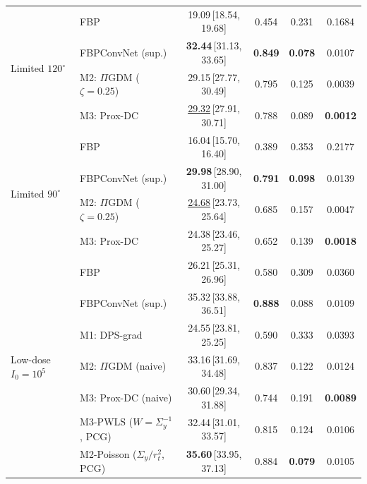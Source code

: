 \begin{tabular}{llcccc}
\midrule
\multirow{4}{*}{Limited $120^\circ$}
 & FBP & 19.09\,{\scriptsize[18.54, 19.68]} & 0.454 & 0.231 & 0.1684 \\
 & FBPConvNet (sup.) & \textbf{32.44}\,{\scriptsize[31.13, 33.65]} & \textbf{0.849} & \textbf{0.078} & 0.0107 \\
 & M2: $\Pi$GDM ($\zeta{=}0.25$) & 29.15\,{\scriptsize[27.77, 30.49]} & 0.795 & 0.125 & 0.0039 \\
 & M3: Prox-DC & \underline{29.32}\,{\scriptsize[27.91, 30.71]} & 0.788 & 0.089 & \textbf{0.0012} \\
\midrule
\multirow{4}{*}{Limited $90^\circ$}
 & FBP & 16.04\,{\scriptsize[15.70, 16.40]} & 0.389 & 0.353 & 0.2177 \\
 & FBPConvNet (sup.) & \textbf{29.98}\,{\scriptsize[28.90, 31.00]} & \textbf{0.791} & \textbf{0.098} & 0.0139 \\
 & M2: $\Pi$GDM ($\zeta{=}0.25$) & \underline{24.68}\,{\scriptsize[23.73, 25.64]} & 0.685 & 0.157 & 0.0047 \\
 & M3: Prox-DC & 24.38\,{\scriptsize[23.46, 25.27]} & 0.652 & 0.139 & \textbf{0.0018} \\
\midrule
\multirow{7}{*}{Low-dose $I_0{=}10^5$}
 & FBP & 26.21\,{\scriptsize[25.31, 26.96]} & 0.580 & 0.309 & 0.0360 \\
 & FBPConvNet (sup.) & 35.32\,{\scriptsize[33.88, 36.51]} & \textbf{0.888} & 0.088 & 0.0109 \\
 & M1: DPS-grad & 24.55\,{\scriptsize[23.81, 25.25]} & 0.590 & 0.333 & 0.0393 \\
 & M2: $\Pi$GDM (naive) & 33.16\,{\scriptsize[31.69, 34.48]} & 0.837 & 0.122 & 0.0124 \\
 & M3: Prox-DC (naive) & 30.60\,{\scriptsize[29.34, 31.88]} & 0.744 & 0.191 & \textbf{0.0089} \\
 & M3-PWLS ($W{=}\Sigma_y^{-1}$, PCG) & 32.44\,{\scriptsize[31.01, 33.57]} & 0.815 & 0.124 & 0.0106 \\
 & M2-Poisson ($\Sigma_y/r_t^2$, PCG) & \textbf{35.60}\,{\scriptsize[33.95, 37.13]} & 0.884 & \textbf{0.079} & 0.0105 \\
\bottomrule
\end{tabular}
